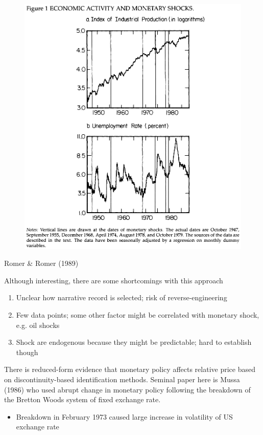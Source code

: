 \documentclass{beamer}
\begin{document}
\begin{frame}
  \begin{figure}
    \includegraphics[scale=.6]{romer_romer.eps}
  \end{figure}
  Romer \& Romer (1989)
\end{frame}

\begin{frame}
  Although interesting, there are some shortcomings with this approach
  \begin{enumerate}
    \item Unclear how narrative record is selected; risk of reverse-engineering 
    \item Few data points; some other factor might be correlated with monetary shock, e.g. oil shocks
    \item Shock are endogenous because they might be predictable; hard to establish though
  \end{enumerate}
\end{frame}

\begin{frame}
  There is reduced-form evidence that monetary policy affects relative price based on discontinuity-based identification methods. 
  Seminal paper here is Mussa (1986) who used abrupt change in monetary policy following the breakdown of the Bretton Woods system of fixed exchange rate.
  \begin{itemize}
    \item Breakdown in  February 1973 caused large increase in volatility of US exchange rate        
  \end{itemize}  
\end{frame}
\end{document}
